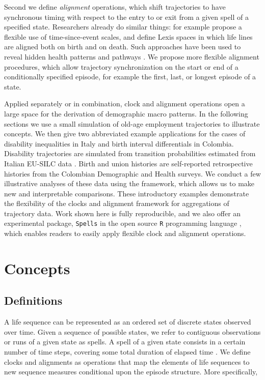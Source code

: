 \documentclass[a4paper,left=1.25cm,right=1.25cm,top=1.25cm,bottom=1.25cm]{article}
\begin{document}
Second we define \emph{alignment} operations, which shift trajectories to have synchronous timing with respect to the entry to or exit from a given spell of a specified state. Researchers already do similar things: for example \citet{iacobelli2013multiple} propose a flexible use of time-since-event scales, and \citet{riffe2017unified} define Lexis spaces in which life lines are aligned both on birth and on death. Such approaches have been used to reveal hidden health patterns \citep{riffe2016time} and pathways \citep{potente2018disability, raab2018pathways}. We propose more flexible alignment procedures, which allow trajectory synchronization on the start or end of a conditionally specified episode, for example the first, last, or longest episode of a state.

Applied separately or in combination, clock and alignment operations open a large space for the derivation of demographic macro patterns. In the following sections we use a small simulation of old-age employment trajectories to illustrate concepts. We then give two abbreviated example applications for the cases of disability inequalities in Italy and birth interval differentials in Colombia. Disability trajectories are simulated from transition probabilities estimated from Italian EU-SILC data \citep{SILC}. Birth and union histories are self-reported retrospective histories from the Colombian Demographic and Health surveys. We conduct a few illustrative analyses of these data using the framework, which allows us to make new and interpretable comparisons. These introductory examples demonstrate the flexibility of the clocks and alignment framework for aggregations of trajectory data. Work shown here is fully reproducible, and we also offer an experimental package, \texttt{Spells} in the open source \texttt{R} programming language \citep{r2020}, which enables readers to easily apply flexible clock and alignment operations.

\section{Concepts}

\subsection{Definitions}

A life sequence can be represented as an ordered set of discrete states observed over time. Given a sequence of possible states, we refer to contiguous observations or runs of a given state as spells. A spell of a given state consists in a certain number of time steps, covering some total duration of elapsed time \citep{cornwell2015}. We define clocks and alignments as operations that map the elements of life sequences to new sequence measures conditional upon the episode structure. More specifically,
\end{document}
